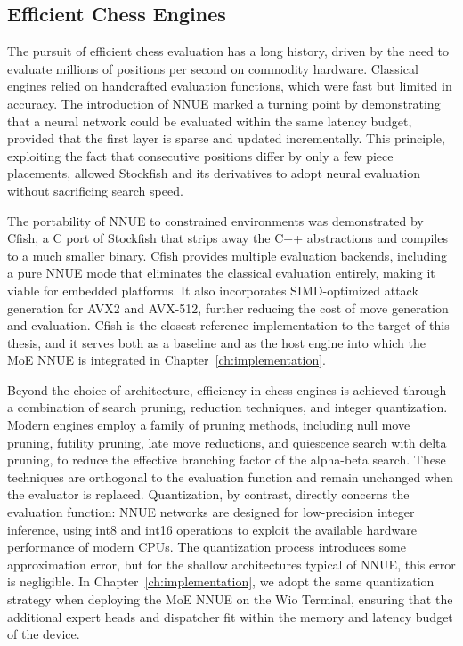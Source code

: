 \subsection{Efficient Chess Engines}\label{sec:rw-efficient}

The pursuit of efficient chess evaluation has a long history, driven by the need to evaluate millions of positions per second on commodity hardware. Classical engines relied on handcrafted evaluation functions, which were fast but limited in accuracy. The introduction of NNUE marked a turning point by demonstrating that a neural network could be evaluated within the same latency budget, provided that the first layer is sparse and updated incrementally. This principle, exploiting the fact that consecutive positions differ by only a few piece placements, allowed Stockfish and its derivatives to adopt neural evaluation without sacrificing search speed.

The portability of NNUE to constrained environments was demonstrated by Cfish, a C port of Stockfish that strips away the C++ abstractions and compiles to a much smaller binary. Cfish provides multiple evaluation backends, including a pure NNUE mode that eliminates the classical evaluation entirely, making it viable for embedded platforms. It also incorporates SIMD-optimized attack generation for AVX2 and AVX-512, further reducing the cost of move generation and evaluation. Cfish is the closest reference implementation to the target of this thesis, and it serves both as a baseline and as the host engine into which the MoE NNUE is integrated in Chapter~\ref{ch:implementation}.

Beyond the choice of architecture, efficiency in chess engines is achieved through a combination of search pruning, reduction techniques, and integer quantization. Modern engines employ a family of pruning methods, including null move pruning, futility pruning, late move reductions, and quiescence search with delta pruning, to reduce the effective branching factor of the alpha-beta search. These techniques are orthogonal to the evaluation function and remain unchanged when the evaluator is replaced. Quantization, by contrast, directly concerns the evaluation function: NNUE networks are designed for low-precision integer inference, using int8 and int16 operations to exploit the available hardware performance of modern CPUs. The quantization process introduces some approximation error, but for the shallow architectures typical of NNUE, this error is negligible. In Chapter~\ref{ch:implementation}, we adopt the same quantization strategy when deploying the MoE NNUE on the Wio Terminal, ensuring that the additional expert heads and dispatcher fit within the memory and latency budget of the device.


